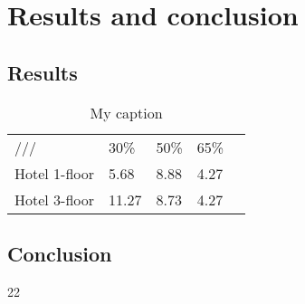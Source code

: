 \section{Results and conclusion}
\subsection{Results}

\begin{table}[]
	\centering
	\caption{My caption}
	\label{my-label}
	\begin{tabular}{lllll}
		///           & 30\%  & 50\% & 65\%  \\
		Hotel 1-floor & 5.68  & 8.88 & 4.27  \\
		Hotel 3-floor & 11.27 & 8.73 & 4.27  \\
	\end{tabular}
\end{table}

\subsection{Conclusion}
 22